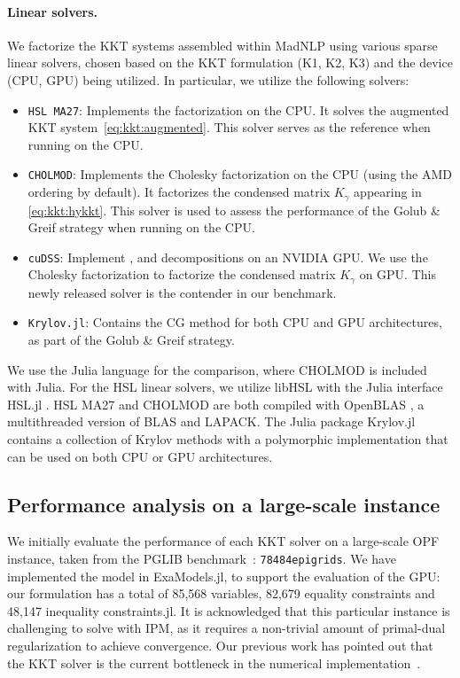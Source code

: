 \paragraph{Linear solvers.}
We factorize the KKT systems assembled within MadNLP using various sparse linear solvers, chosen based on the KKT formulation (K1, K2, K3) and the device (CPU, GPU) being utilized.
In particular, we utilize the following solvers:
\begin{itemize}
  \item {\tt HSL MA27}: Implements the \lblt factorization on the CPU.
    It solves the augmented KKT system~\eqref{eq:kkt:augmented}.
    This solver serves as the reference when running on the CPU.
  \item {\tt CHOLMOD}: Implements the Cholesky factorization on the CPU
    (using the AMD ordering \cite{amestoy-david-duff-2004} by default).
    It factorizes the condensed matrix $K_\gamma$ appearing in \eqref{eq:kkt:hykkt}.
    This solver is used to assess the performance of the Golub \& Greif strategy when running on the CPU.
  \item {\tt cuDSS}: Implement \llt, \ldlt and \lu decompositions on an NVIDIA GPU.
    We use the Cholesky factorization to factorize the condensed matrix $K_\gamma$ on GPU.
    This newly released solver is the contender in our benchmark.
  \item {\tt Krylov.jl}: Contains the CG method for both CPU and GPU architectures, as part of the Golub \& Greif strategy.
\end{itemize}

We use the Julia language \cite{bezanson-edelman-karpinski-shah-2017} for the comparison, where CHOLMOD \cite{chen-davis-hager-rajamanickam-2008} is included with Julia.
For the HSL linear solvers, we utilize libHSL \cite{fowkes-lister-montoison-orban-2024} with the Julia interface HSL.jl \cite{montoison-orban-hsl-2021}.
HSL MA27 and CHOLMOD are both compiled with OpenBLAS \cite{openblas}, a multithreaded version of BLAS and LAPACK.
The Julia package Krylov.jl~\cite{montoison2023krylov} contains a collection of Krylov methods with a polymorphic implementation that can be used on both CPU or GPU architectures.

\subsection{Performance analysis on a large-scale instance}
We initially evaluate the performance of each KKT solver on a large-scale OPF instance, taken from
the PGLIB benchmark~\cite{babaeinejadsarookolaee2019power}: {\tt 78484epigrids}.
We have implemented the model in ExaModels.jl, to support
the evaluation of the GPU: our formulation has
a total of 85,568 variables, 82,679 equality constraints and 48,147
inequality constraints.jl.
It is acknowledged that this particular instance is challenging to solve
with IPM, as it requires a non-trivial amount of primal-dual regularization
to achieve convergence.
Our previous work has pointed out that the KKT solver is the current bottleneck
in the numerical implementation~\cite{shin2023accelerating}.

